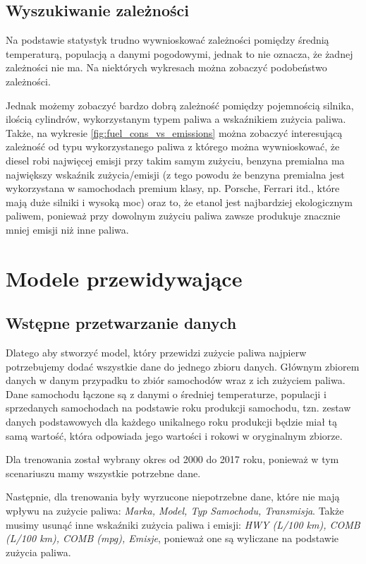 \documentclass[9pt,a4paper,twoside]{rho}
\begin{document}
    \subsection*{Wyszukiwanie zależności}
        Na podstawie statystyk trudno wywnioskować zależności pomiędzy średnią temperaturą, populacją a danymi pogodowymi, jednak to nie oznacza, że żadnej zależności nie ma. Na niektórych wykresach można zobaczyć podobeństwo zależności.
        
        Jednak możemy zobaczyć bardzo dobrą zależność pomiędzy pojemnością silnika, ilością cylindrów, wykorzystanym typem paliwa a wskaźnikiem zużycia paliwa. Także, na wykresie \ref{fig:fuel_cons_vs_emissions} można zobaczyć interesującą zależność od typu wykorzystanego paliwa z którego można wywnioskować, że diesel robi najwięcej emisji przy takim samym zużyciu, benzyna premialna ma największy wskaźnik zużycia/emisji (z tego powodu że benzyna premialna jest wykorzystana w samochodach premium klasy, np. Porsche, Ferrari itd., które mają duże silniki i wysoką moc) oraz to, że etanol jest najbardziej ekologicznym paliwem, ponieważ przy dowolnym zużyciu paliwa zawsze produkuje znacznie mniej emisji niż inne paliwa.

\section*{Modele przewidywające}
    \subsection*{Wstępne przetwarzanie danych}
        Dlatego aby stworzyć model, który przewidzi zużycie paliwa najpierw potrzebujemy dodać wszystkie dane do jednego zbioru danych. Głównym zbiorem danych w danym przypadku to zbiór samochodów wraz z ich zużyciem paliwa. Dane samochodu łączone są z danymi o średniej temperaturze, populacji i sprzedanych samochodach na podstawie roku produkcji samochodu, tzn. zestaw danych podstawowych dla każdego unikalnego roku produkcji będzie miał tą samą wartość, która odpowiada jego wartości i rokowi w oryginalnym zbiorze.
        
        Dla trenowania został wybrany okres od 2000 do 2017 roku, ponieważ w tym scenariuszu mamy wszystkie potrzebne dane.

        Następnie, dla trenowania były wyrzucone niepotrzebne dane, które nie mają wpływu na zużycie paliwa: \textit{Marka, Model, Typ Samochodu, Transmisja}. Także musimy usunąć inne wskaźniki zużycia paliwa i emisji: \textit{HWY (L/100 km), COMB (L/100 km), COMB (mpg), Emisje}, ponieważ one są wyliczane na podstawie zużycia paliwa.
        
\end{document}
